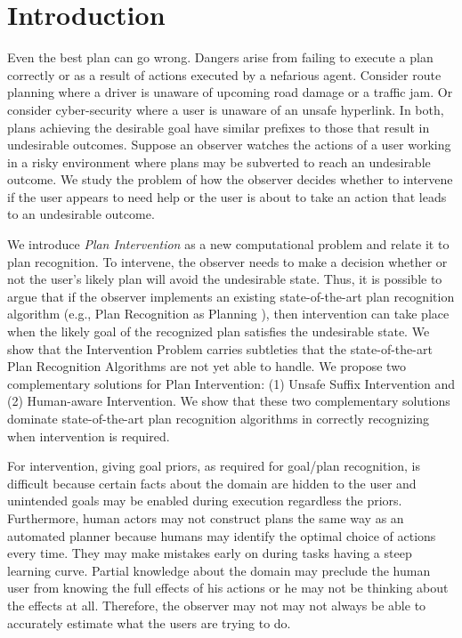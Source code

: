 \section{Introduction}
\noindent Even the best plan can go wrong. 
Dangers arise from failing to execute a plan correctly or as a result of actions executed by a nefarious agent. 
Consider route planning where a driver is unaware of upcoming road damage or a traffic jam. 
Or consider cyber-security where a user is unaware of an unsafe hyperlink. 
In both, plans achieving the desirable goal have similar prefixes to those that result in undesirable outcomes.
Suppose an observer watches the actions of a user working in a risky environment where plans may be subverted to reach an undesirable outcome. 
We study the problem of how the observer decides whether to intervene if the user appears to need help or the user is about to take an action that leads to an undesirable outcome.

We introduce \textit{Plan Intervention} as a new computational problem and relate it to plan recognition. 
To intervene, the observer needs to make a decision whether or not the user's likely plan will avoid the undesirable state. 
Thus, it is possible to argue that if the observer implements an existing state-of-the-art plan recognition algorithm (e.g., Plan Recognition as Planning \cite{ramirez2009plan}), then intervention can take place when the likely goal of the recognized plan satisfies the undesirable state. 
We show that the Intervention Problem carries subtleties that the state-of-the-art Plan Recognition Algorithms are not yet able to handle.
We propose two complementary solutions for Plan Intervention: (1) Unsafe Suffix Intervention and (2) Human-aware Intervention. 
We show that these two complementary solutions dominate state-of-the-art plan recognition algorithms in correctly recognizing when intervention is required.

For intervention, giving goal priors, as required for goal/plan recognition, is difficult because certain facts about the domain are hidden to the user and unintended goals may be enabled during execution regardless the priors. 
Furthermore, human actors may not construct plans the same way as an automated planner because humans may identify the optimal choice of actions every time. 
They may  make mistakes early on during tasks having a steep learning curve. 
Partial knowledge about the domain may preclude the human user from knowing the full effects of his actions or he may not be thinking about the effects at all. 
Therefore, the observer may not may not always be able to accurately estimate what the users are trying to do.

